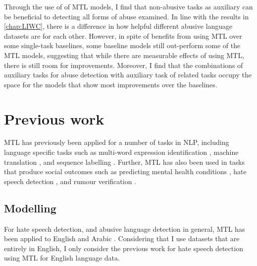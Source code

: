 Through the use of of MTL models, I find that non-abusive tasks as auxiliary can be beneficial to detecting all forms of abuse examined.
In line with the results in \cref{chap:LIWC}, there is a difference in how helpful different abusive language datasets are for each other.
However, in spite of benefits from using MTL over some single-task baselines, some baseline models still out-perform some of the MTL models, suggesting that while there are measurable effects of using MTL, there is still room for improvements.
Moreover, I find that the combinations of auxiliary tasks for abuse detection with auxiliary task of related tasks occupy the space for the models that show most improvements over the baselines.

\section{Previous work}
MTL has previously been applied for a number of tasks in NLP, including language specific tasks such as multi-word expression identification \cite{Bingel-Bjerva:2018}, machine translation \cite{Dong:2015}, and sequence labelling \cite{Rei:2017}.
Further, MTL has also been used in tasks that produce social outcomes such as predicting mental health conditions \cite{Benton:2017}, hate speech detection \cite{Waseem:2018,Rajamanickam:2020,Farha:2020,Djandji:2020}, and rumour verification \cite{Kochkina:2018}.

\subsection{Modelling}
For hate speech detection, and abusive language detection in general, MTL has been applied to English \citep{Waseem:2018,Rajamanickam:2020} and Arabic \citep{Farha:2020,Djandji:2020}.
Considering that I use datasets that are entirely in English, I only consider the previous work for hate speech detection using MTL for English language data.

